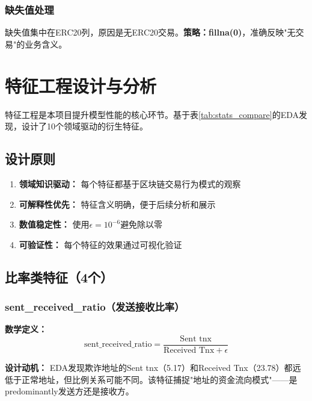 \documentclass[12pt,a4paper]{article}
\begin{document}
\subsubsection{缺失值处理}

缺失值集中在ERC20列，原因是无ERC20交易。\textbf{策略：fillna(0)}，准确反映"无交易"的业务含义。

\section{特征工程设计与分析}

特征工程是本项目提升模型性能的核心环节。基于表\ref{tab:stats_compare}的EDA发现，设计了10个领域驱动的衍生特征。

\subsection{设计原则}

\begin{enumerate}
    \item \textbf{领域知识驱动：} 每个特征都基于区块链交易行为模式的观察
    \item \textbf{可解释性优先：} 特征含义明确，便于后续分析和展示
    \item \textbf{数值稳定性：} 使用$\epsilon=10^{-6}$避免除以零
    \item \textbf{可验证性：} 每个特征的效果通过可视化验证
\end{enumerate}

\subsection{比率类特征（4个）}

\subsubsection{sent\_received\_ratio（发送接收比率）}

\textbf{数学定义：}
\begin{equation}
\text{sent\_received\_ratio} = \frac{\text{Sent tnx}}{\text{Received Tnx} + \epsilon}
\end{equation}

\textbf{设计动机：} EDA发现欺诈地址的Sent tnx（5.17）和Received Tnx（23.78）都远低于正常地址，但比例关系可能不同。该特征捕捉"地址的资金流向模式"——是 predominantly发送方还是接收方。
\end{document}
